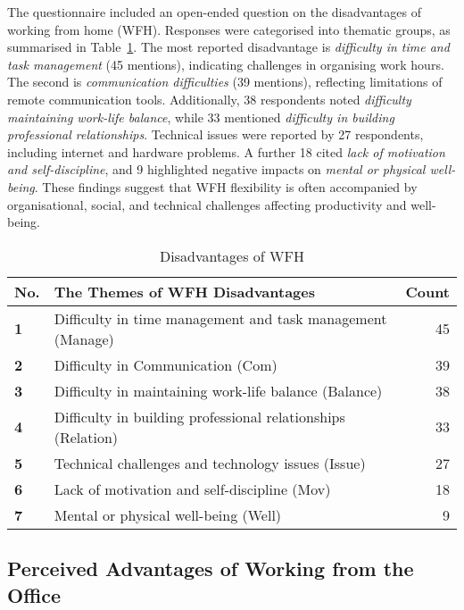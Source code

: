 \documentclass{infotel}
\begin{document}
The questionnaire included an open-ended question on the disadvantages of working from home (WFH). Responses were categorised into thematic groups, as summarised in Table~\ref{Disadvantages of WFH}. The most reported disadvantage is \textit{difficulty in time and task management} (45 mentions), indicating challenges in organising work hours. The second is \textit{communication difficulties} (39 mentions), reflecting limitations of remote communication tools. Additionally, 38 respondents noted \textit{difficulty maintaining work-life balance}, while 33 mentioned \textit{difficulty in building professional relationships}. Technical issues were reported by 27 respondents, including internet and hardware problems. A further 18 cited \textit{lack of motivation and self-discipline}, and 9 highlighted negative impacts on \textit{mental or physical well-being}. These findings suggest that WFH flexibility is often accompanied by organisational, social, and technical challenges affecting productivity and well-being.

\renewcommand{\arraystretch}{1.3}
\begin{table}
	\centering
	\caption{Disadvantages of WFH}
	\label{Disadvantages of WFH}
	\begin{tabular}{p{} p{} r}
		\hline
		\textbf{No.} & \textbf{The Themes of WFH Disadvantages} & \textbf{Count} \\ 
		\hline
		\textbf{1} & Difficulty in time management and task management (Manage) & 45 \\ 
		\textbf{2} & Difficulty in Communication (Com) & 39 \\ 
		\textbf{3} & Difficulty in maintaining work-life balance (Balance) & 38 \\ 
		\textbf{4} & Difficulty in building professional relationships (Relation) & 33 \\ 
		\textbf{5} & Technical challenges and technology issues (Issue) & 27 \\ 
		\textbf{6} & Lack of motivation and self-discipline (Mov) & 18 \\ 
		\textbf{7} & Mental or physical well-being (Well) & 9 \\ 
		\hline
	\end{tabular}
\end{table}



\subsection{Perceived Advantages of Working from the Office}
\label{sec:advantage-wfo}
\end{document}
